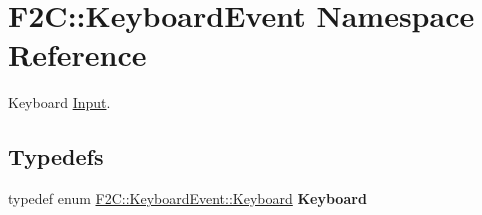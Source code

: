 \hypertarget{namespace_f2_c_1_1_keyboard_event}{
\section{F2C::KeyboardEvent Namespace Reference}
\label{namespace_f2_c_1_1_keyboard_event}
}


Keyboard \hyperlink{class_f2_c_1_1_input}{Input}.  


\subsection*{Typedefs}
\begin{DoxyCompactItemize}
\item 
\hypertarget{namespace_f2_c_1_1_keyboard_event_a115f34a8fab28682735331d390a686a0}{
typedef enum \hyperlink{namespace_f2_c_1_1_keyboard_event_a13172bec547dc5eb2eee6c4fcd64c486}{F2C::KeyboardEvent::Keyboard} {\bfseries Keyboard}}
\label{namespace_f2_c_1_1_keyboard_event_a115f34a8fab28682735331d390a686a0}

\end{DoxyCompactItemize}
